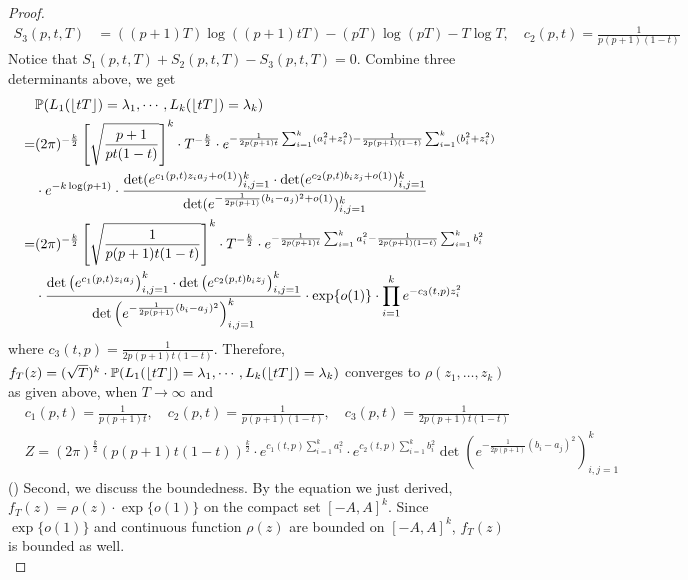 \begin{proof}
\begin{align*}
S_{3}(p,t,T)&=((p+1)T)\log((p+1)tT)-(pT)\log(pT)-T\log T,\quad c_{2}(p,t)=\frac{1}{p(p+1)(1-t)}\end{align*}
Notice that $S_{1}(p,t,T)+S_{2}(p,t,T)-S_{3}(p,t,T)=0$. Combine three determinants above, we get
\begin{align*}
	& \mathbb{P}(L_1(\lfloor tT\rfloor)=\lambda_1,\cdots, L_k(\lfloor tT\rfloor)=\lambda_k)\\
	= & (2\pi)^{-\frac{k}{2}}\left[\sqrt{\frac{p+1}{pt(1-t)}}\right]^{k}\cdot T^{-\frac{k}{2}} \cdot e^{-\frac{1}{2p(p+1)t}\sum_{i=1}^{k}(a_{i}^2+z_{i}^2)-\frac{1}{2p(p+1)(1-t)}\sum_{i=1}^{k}(b_{i}^2+z_{i}^{2})}\\
	& \cdot e^{-k\log(p+1)}\cdot \frac{\det(e^{c_{1}(p,t)z_{i}a_{j}+o(1)})_{i,j=1}^{k}\cdot \det(e^{c_{2}(p,t)b_{i}z_{j}+o(1)})_{i,j=1}^{k}}{\det(e^{-\frac{1}{2p(p+1)}(b_{i}-a_{j})^{2}+o(1)})_{i,j=1}^{k}}\\
	= &(2\pi)^{-\frac{k}{2}}\left[\sqrt{\frac{1}{p(p+1)t(1-t)}}\right]^{k}\cdot T^{-\frac{k}{2}}\cdot e^{-\frac{1}{2p(p+1)t}\sum_{i=1}^{k}a_{i}^2-\frac{1}{2p(p+1)(1-t)}\sum_{i=1}^{k}b_{i}^2}\\
	& \cdot\frac{\det\left(e^{c_{1}(p,t)z_{i}a_{j}}\right)_{i,j=1}^{k}\cdot \det\left(e^{c_{2}(p,t)b_{i}z_{j}}\right)_{i,j=1}^{k}}{\det\left(e^{-\frac{1}{2p(p+1)}(b_{i}-a_{j})^{2}}\right)_{i,j=1}^{k}}\cdot \exp\{o(1)\}\cdot \prod_{i=1}^{k}e^{-c_{3}(t,p)z_{i}^2}
\end{align*}
where $c_{3}(t,p)=\frac{1}{2p(p+1)t(1-t)}$.
Therefore, $f_{T}(z)=(\sqrt{T})^{k}\cdot\mathbb{P}(L_1(\lfloor tT\rfloor)=\lambda_1,\cdots, L_k(\lfloor tT\rfloor)=\lambda_k)$ converges to $\rho(z_{1},\dots,z_{k})$ as given above, when $T\rightarrow\infty$ and 
\begin{align*}
	&c_{1}(p,t)=\frac{1}{p(p+1)t}, \quad c_{2}(p,t)=\frac{1}{p(p+1)(1-t)}, \quad c_{3}(p,t)=\frac{1}{2p(p+1)t(1-t)}\\
	&Z=(2\pi)^{\frac{k}{2}}(p(p+1)t(1-t))^{\frac{k}{2}}\cdot e^{c_{1}(t,p)\sum_{i=1}^{k}a_{i}^{2}}\cdot e^{c_{2}(t,p)\sum_{i=1}^{k}b_{i}^{2}}\det\left(e^{-\frac{1}{2p(p+1)}(b_{i}-a_{j})^{2}}\right)_{i,j=1}^{k}
\end{align*}
() Second, we discuss the boundedness. By the equation we just derived, $f_{T}(z)=\rho(z)\cdot\exp\{o(1)\}$ on the compact set $[-A,A]^{k}$. Since $\exp\{o(1)\}$ and continuous function $\rho(z)$ are bounded on $[-A,A]^{k}$, $f_{T}(z)$ is bounded as well.\\


\end{proof}
